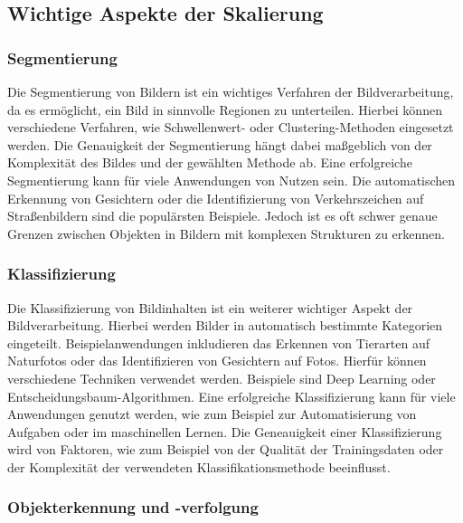 \subsection{Wichtige Aspekte der Skalierung}
    \subsubsection{Segmentierung}
    
        Die Segmentierung von Bildern ist ein wichtiges Verfahren der Bildverarbeitung, da es ermöglicht, ein Bild in sinnvolle Regionen zu unterteilen. 
        Hierbei können verschiedene Verfahren, wie Schwellenwert- oder Clustering-Methoden eingesetzt werden. 
        Die Genauigkeit der Segmentierung hängt dabei maßgeblich von der Komplexität des Bildes und der gewählten Methode ab.
        Eine erfolgreiche Segmentierung kann für viele Anwendungen von Nutzen sein.
        Die automatischen Erkennung von Gesichtern oder die Identifizierung von Verkehrszeichen auf Straßenbildern sind die populärsten Beispiele.
        Jedoch ist es oft schwer genaue Grenzen zwischen Objekten in Bildern mit komplexen Strukturen zu erkennen.
    
    \subsubsection{Klassifizierung}
    
        Die Klassifizierung von Bildinhalten ist ein weiterer wichtiger Aspekt der Bildverarbeitung.
        Hierbei werden Bilder in automatisch bestimmte Kategorien eingeteilt. 
        Beispielanwendungen inkludieren das Erkennen von Tierarten auf Naturfotos oder das Identifizieren von Gesichtern auf Fotos. 
        Hierfür können verschiedene Techniken verwendet werden. Beispiele sind Deep Learning oder Entscheidungsbaum-Algorithmen.
        Eine erfolgreiche Klassifizierung kann für viele Anwendungen genutzt werden, wie zum Beispiel zur Automatisierung von Aufgaben oder im maschinellen Lernen. 
        Die Geneauigkeit einer Klassifizierung wird von Faktoren, wie zum Beispiel von der Qualität der Trainingsdaten oder der Komplexität der verwendeten Klassifikationsmethode beeinflusst.
    
    \subsubsection{Objekterkennung und -verfolgung}
    
